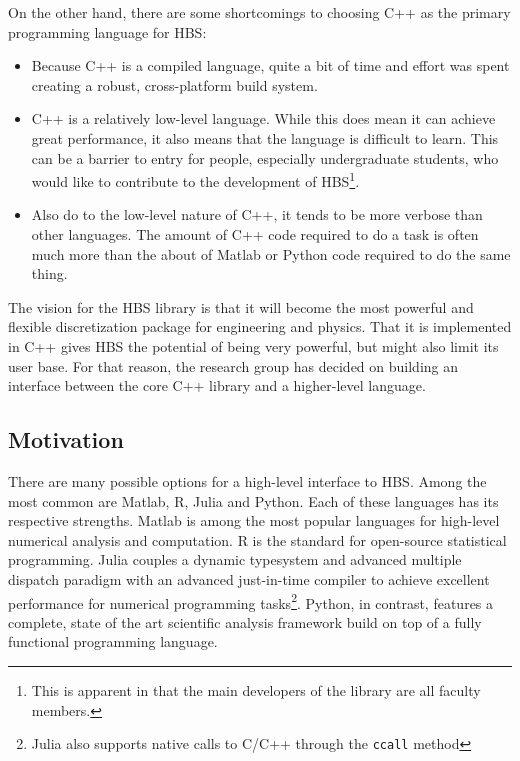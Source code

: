     On the other hand, there are some shortcomings to choosing C++ as the primary programming language for HBS:

    \begin{itemize}
      \item Because C++ is a compiled language, quite a bit of time and effort was spent creating a robust, cross-platform build system.
      \item  C++ is a relatively low-level language. While this does mean it can achieve great performance, it also means that the language is difficult to learn. This can be a barrier to entry for people, especially undergraduate students, who would like to contribute to the development of HBS\footnote{This is apparent in that the main developers of the library are all faculty members.}.
      \item Also do to the low-level nature of C++, it tends to be more verbose than other languages. The amount of C++ code required to do a task is often much more than the about of Matlab or Python code required to do the same thing.
    \end{itemize}
    \mainstretch{}

    The vision for the HBS library is that it will become the most powerful and flexible discretization package for engineering and physics. That it is implemented in C++ gives HBS the potential of being very powerful, but might also limit its user base. For that reason, the research group has decided on building an interface between the core C++ library and a higher-level language.

  \subsection{Motivation} \label{ssec:motivation}

    There are many possible options for a high-level interface to HBS. Among the most common are Matlab, R, Julia and Python. Each of these languages has its respective strengths. Matlab is among the most popular languages for high-level numerical analysis and computation. R is the standard for open-source statistical programming. Julia couples a dynamic typesystem and advanced multiple dispatch paradigm with an advanced just-in-time compiler to achieve excellent performance for numerical programming tasks\footnote{Julia also supports native calls to C/C++ through the \texttt{ccall} method}. Python, in contrast, features a complete, state of the art scientific analysis framework build on top of a fully functional programming language.


